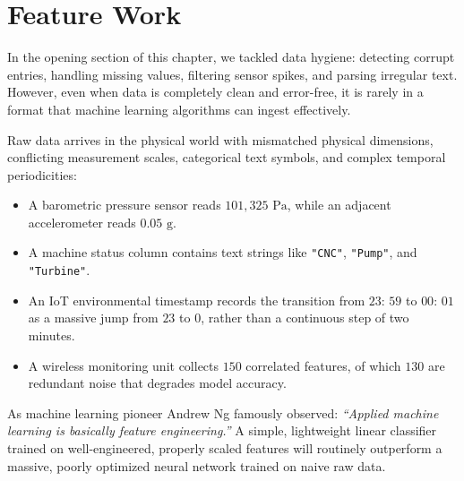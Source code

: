 \section{Feature Work}\label{sec:feature_work}

In the opening section of this chapter, we tackled data hygiene: detecting corrupt entries, handling missing values, filtering sensor spikes, and parsing irregular text. However, even when data is completely clean and error-free, it is rarely in a format that machine learning algorithms can ingest effectively.

Raw data arrives in the physical world with mismatched physical dimensions, conflicting measurement scales, categorical text symbols, and complex temporal periodicities:
\begin{itemize}
    \item A barometric pressure sensor reads $101{,}325\text{ Pa}$, while an adjacent accelerometer reads $0.05\text{ g}$.
    \item A machine status column contains text strings like \texttt{"CNC"}, \texttt{"Pump"}, and \texttt{"Turbine"}.
    \item An IoT environmental timestamp records the transition from $23\text{: }59$ to $00\text{: }01$ as a massive jump from $23$ to $0$, rather than a continuous step of two minutes.
    \item A wireless monitoring unit collects $150$ correlated features, of which $130$ are redundant noise that degrades model accuracy.
\end{itemize}

As machine learning pioneer Andrew Ng famously observed: \textit{``Applied machine learning is basically feature engineering.''} A simple, lightweight linear classifier trained on well-engineered, properly scaled features will routinely outperform a massive, poorly optimized neural network trained on naive raw data.

